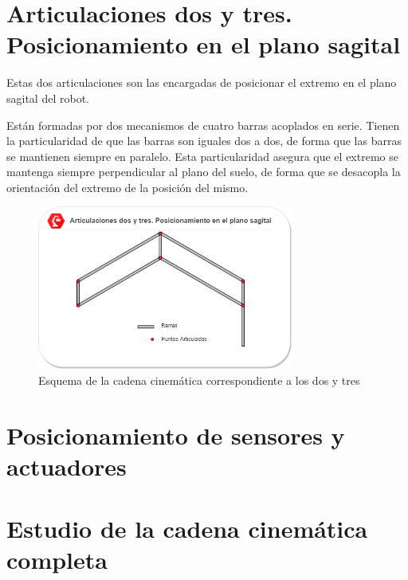 \section{Articulaciones dos y tres. Posicionamiento en el plano sagital} \label{sec:Mecanica:articulacion_dostres}
    Estas dos articulaciones son las encargadas de posicionar el extremo en el plano sagital del robot.
    
    Están formadas por dos mecanismos de cuatro barras acoplados en serie. Tienen la particularidad de que las barras son iguales dos a dos, de forma que las barras se mantienen siempre en paralelo. Esta particularidad asegura que el extremo se mantenga siempre perpendicular al plano del suelo, de forma que se desacopla la orientación del extremo de la posición del mismo.
    
    \begin{figure}[H]
    \centering
    \includegraphics[width=0.75\textwidth]{figuras/mecanismos_4_barras.png}   
    \caption{Esquema de la cadena cinemática correspondiente a los  dos y tres}
    \label{fig:Mecanica:4_bar_mecanism}
    \end{figure}

\section{Posicionamiento de sensores y actuadores} \label{sec:Mecanica:sensores_actuadore}

\section{Estudio de la cadena cinemática completa} \label{sec:Mecanica:cadena_cinematica}
